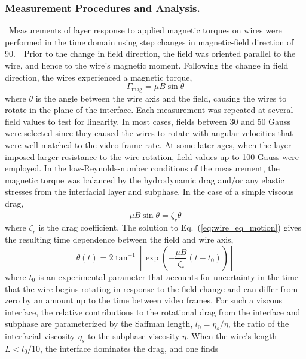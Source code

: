 \subsubsection{Measurement Procedures and Analysis.}~Measurements of layer response to applied magnetic torques on wires were performed in the time domain using step changes in magnetic-field direction of 90\degree.~~Prior to the change in field direction, the field was oriented parallel to the wire, and hence to the wire's magnetic moment. Following the change in field direction, the wires experienced a magnetic torque, 
\begin{equation}
\Gamma_\text{mag} = \mu B \sin{\theta}
\end{equation}
where $\theta$ is the angle between the wire axis and the field, causing the wires to rotate in the plane of the interface.  Each measurement was repeated at several field values to test for linearity.  In most cases, fields between 30 and 50 Gauss were selected since they caused the wires to rotate with angular velocities that were well matched to the video frame rate.  At some later ages, when the layer imposed larger resistance to the wire rotation, field values up to 100 Gauss were employed.   In the low-Reynolds-number conditions of the measurement, the magnetic torque was balanced by the hydrodynamic drag and/or any elastic stresses from the interfacial layer and subphase.  In the case of a simple viscous drag, 
\begin{equation}
  \mu B \sin\theta = \zeta_r \dot{\theta}
  \label{eq:wire_eq_motion}
\end{equation}
\noindent where $\zeta_r$ is the drag coefficient.  The solution to Eq.~(\ref{eq:wire_eq_motion}) gives the resulting time dependence between the field and wire axis,\cite{Sasha} 
\begin{equation}
  \theta(t) = 2 \tan^{-1} \left[ \exp \left( -\frac{\mu B}{\zeta_r} (t-t_0) \right) \right]
  \label{eq:sasha}
\end{equation}
where $t_0$ is an experimental parameter that accounts for uncertainty in the time that the wire begins rotating in response to the field change and can differ from zero by an amount up to the time between video frames.  For such a viscous interface, the relative contributions to the rotational drag from the interface and subphase are parameterized by the Saffman length, $l_0=\eta_s/\eta$, the ratio of the interfacial viscosity $\eta_s$ to the subphase viscosity $\eta$. When the wire's length $L < l_0/10$, the interface dominates the drag, and one finds \cite{Levine2004}

